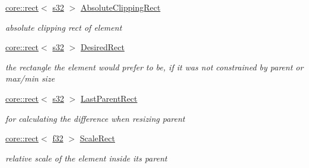 \begin{DoxyCompactItemize}
\mbox{\label{classirr_1_1gui_1_1IGUIElement_a1965779938ee0d61282f42abf2d67e74}} 
\hyperlink{classirr_1_1core_1_1rect}{core\+::rect}$<$ \hyperlink{namespaceirr_ac66849b7a6ed16e30ebede579f9b47c6}{s32} $>$ \hyperlink{classirr_1_1gui_1_1IGUIElement_a1965779938ee0d61282f42abf2d67e74}{Absolute\+Clipping\+Rect}
\begin{DoxyCompactList}\small\item\em absolute clipping rect of element \end{DoxyCompactList}\item 
\mbox{\label{classirr_1_1gui_1_1IGUIElement_a1c6a6bc712abdb6f92be385c86a7f42c}} 
\hyperlink{classirr_1_1core_1_1rect}{core\+::rect}$<$ \hyperlink{namespaceirr_ac66849b7a6ed16e30ebede579f9b47c6}{s32} $>$ \hyperlink{classirr_1_1gui_1_1IGUIElement_a1c6a6bc712abdb6f92be385c86a7f42c}{Desired\+Rect}
\begin{DoxyCompactList}\small\item\em the rectangle the element would prefer to be, if it was not constrained by parent or max/min size \end{DoxyCompactList}\item 
\mbox{\label{classirr_1_1gui_1_1IGUIElement_a1e81d741d4fdef9ce62b06ede927ca79}} 
\hyperlink{classirr_1_1core_1_1rect}{core\+::rect}$<$ \hyperlink{namespaceirr_ac66849b7a6ed16e30ebede579f9b47c6}{s32} $>$ \hyperlink{classirr_1_1gui_1_1IGUIElement_a1e81d741d4fdef9ce62b06ede927ca79}{Last\+Parent\+Rect}
\begin{DoxyCompactList}\small\item\em for calculating the difference when resizing parent \end{DoxyCompactList}\item 
\mbox{\label{classirr_1_1gui_1_1IGUIElement_ae983089017102cfb3fb016ce0186cbc3}} 
\hyperlink{classirr_1_1core_1_1rect}{core\+::rect}$<$ \hyperlink{namespaceirr_a0277be98d67dc26ff93b1a6a1d086b07}{f32} $>$ \hyperlink{classirr_1_1gui_1_1IGUIElement_ae983089017102cfb3fb016ce0186cbc3}{Scale\+Rect}
\begin{DoxyCompactList}\small\item\em relative scale of the element inside its parent \end{DoxyCompactList}\item 

\end{DoxyCompactItemize}
